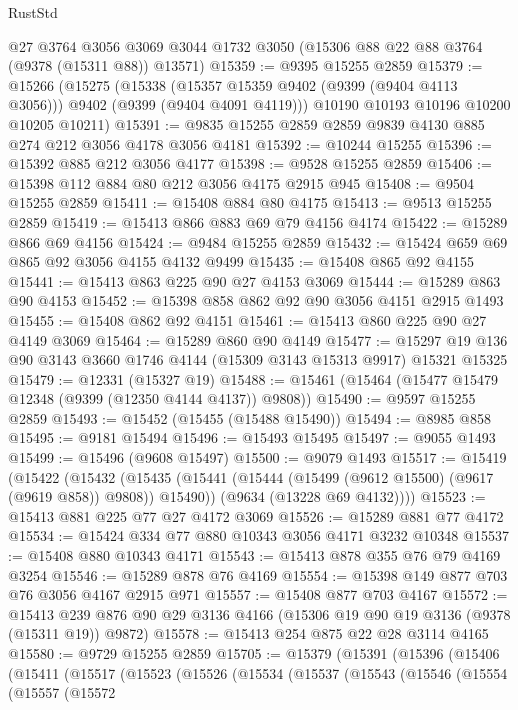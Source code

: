 \begin{lexlean}{RustStd}
\begin{coremodule}
    @27
    @3764
    @3056
    @3069
    @3044
    @1732
    @3050
    (@15306 @88 @22 @88 @3764 (@9378 (@15311 @88)) @13571)
@15359 := @9395 @15255 @2859
@15379 := @15266
    (@15275
      (@15338 (@15357 @15359 @9402 (@9399 (@9404 @4113 @3056))) @9402 (@9399 (@9404 @4091 @4119)))
      @10190
      @10193
      @10196
      @10200
      @10205
      @10211)
@15391 := @9835 @15255 @2859 @2859 @9839 @4130 @885 @274 @212 @3056 @4178 @3056 @4181
@15392 := @10244 @15255
@15396 := @15392 @885 @212 @3056 @4177
@15398 := @9528 @15255 @2859
@15406 := @15398 @112 @884 @80 @212 @3056 @4175 @2915 @945
@15408 := @9504 @15255 @2859
@15411 := @15408 @884 @80 @4175
@15413 := @9513 @15255 @2859
@15419 := @15413 @866 @883 @69 @79 @4156 @4174
@15422 := @15289 @866 @69 @4156
@15424 := @9484 @15255 @2859
@15432 := @15424 @659 @69 @865 @92 @3056 @4155 @4132 @9499
@15435 := @15408 @865 @92 @4155
@15441 := @15413 @863 @225 @90 @27 @4153 @3069
@15444 := @15289 @863 @90 @4153
@15452 := @15398 @858 @862 @92 @90 @3056 @4151 @2915 @1493
@15455 := @15408 @862 @92 @4151
@15461 := @15413 @860 @225 @90 @27 @4149 @3069
@15464 := @15289 @860 @90 @4149
@15477 := @15297 @19 @136 @90 @3143 @3660 @1746 @4144 (@15309 @3143 @15313 @9917) @15321 @15325
@15479 := @12331 (@15327 @19)
@15488 := @15461 (@15464 (@15477 @15479 @12348 (@9399 (@12350 @4144 @4137)) @9808))
@15490 := @9597 @15255 @2859
@15493 := @15452 (@15455 (@15488 @15490))
@15494 := @8985 @858
@15495 := @9181 @15494
@15496 := @15493 @15495
@15497 := @9055 @1493
@15499 := @15496 (@9608 @15497)
@15500 := @9079 @1493
@15517 := @15419
    (@15422
      (@15432
        (@15435 (@15441 (@15444 (@15499 (@9612 @15500) (@9617 (@9619 @858)) @9808)) @15490))
        (@9634 (@13228 @69 @4132))))
@15523 := @15413 @881 @225 @77 @27 @4172 @3069
@15526 := @15289 @881 @77 @4172
@15534 := @15424 @334 @77 @880 @10343 @3056 @4171 @3232 @10348
@15537 := @15408 @880 @10343 @4171
@15543 := @15413 @878 @355 @76 @79 @4169 @3254
@15546 := @15289 @878 @76 @4169
@15554 := @15398 @149 @877 @703 @76 @3056 @4167 @2915 @971
@15557 := @15408 @877 @703 @4167
@15572 := @15413 @239 @876 @90 @29 @3136 @4166 (@15306 @19 @90 @19 @3136 (@9378 (@15311 @19)) @9872)
@15578 := @15413 @254 @875 @22 @28 @3114 @4165
@15580 := @9729 @15255 @2859
@15705 := @15379
    (@15391
      (@15396
        (@15406
          (@15411
            (@15517
              (@15523
                (@15526
                  (@15534
                    (@15537
                      (@15543
                        (@15546
                          (@15554
                            (@15557
                              (@15572

\end{coremodule}
\end{lexlean}
